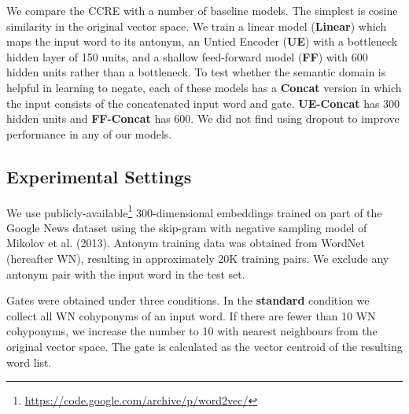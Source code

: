 \documentclass[11pt]{article}
\begin{document}
We compare the CCRE with a number of baseline models. The simplest is cosine similarity in the original vector space. We train a linear model ({\bf Linear}) which maps the input word to its antonym, an Untied Encoder ({\bf UE}) with a bottleneck hidden layer of 150 units, and a shallow feed-forward model ({\bf FF}) with 600 hidden units rather than a bottleneck. To test whether the semantic domain is helpful in learning to negate, each of these models has a {\bf Concat} version in which the input consists of the concatenated input word and gate. {\bf UE-Concat} has 300 hidden units and {\bf FF-Concat} has 600. We did not find using dropout to improve performance in any of our models.

\subsection{Experimental Settings}


We use publicly-available\footnote{\url{https://code.google.com/archive/p/word2vec/}} 300-dimensional embeddings trained on part of the Google News dataset using the skip-gram with negative sampling model of Mikolov et al. (2013).
Antonym training data was obtained from WordNet (hereafter WN), resulting in approximately 20K training pairs.
We exclude any antonym pair with the input word in the test set.

Gates were obtained under three conditions. In the {\bf standard} condition we collect all WN cohyponyms of an input word. If there are fewer than 10 WN cohyponyms, we increase the number to 10 with nearest neighbours from the original vector space. The gate is calculated as the vector centroid of the resulting word list. 


\end{document}
